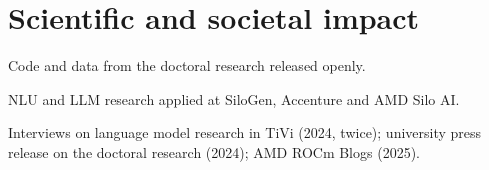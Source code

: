 \documentclass[12pt,a4paper]{article}
\newenvironment{entries}{%
  \begin{list}{}{%
    \setlength{\labelwidth}{2.7cm}%
    \setlength{\labelsep}{0.3cm}%
    \setlength{\leftmargin}{3.0cm}%
    \setlength{\itemsep}{2pt}%
    \setlength{\parsep}{0pt}%
    \setlength{\topsep}{1pt}%
    \renewcommand{\makelabel}[1]{##1\hfil}}}%
  {\end{list}}
\begin{document}
\section{Scientific and societal impact}
\begin{entries}
  \item[Open science] Code and data from the doctoral research released openly.
  \item[Utilisation] NLU and LLM research applied at SiloGen, Accenture and AMD Silo AI.
  \item[Media] Interviews on language model research in TiVi (2024, twice); university press release on the doctoral research (2024); AMD ROCm Blogs (2025).
\end{entries}
\end{document}
